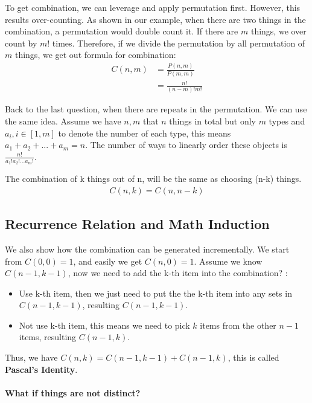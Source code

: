 \documentclass[../main.tex]{subfiles}
\begin{document}
To get combination, we can leverage and apply permutation first. However, this results over-counting. As shown in our example, when there are two things in the combination, a permutation would double count it. If there are $m$ things, we over count by $m!$ times. Therefore, if we  divide the permutation by all permutation of $m$ things, we get out formula for combination:
\begin{align}
    C(n,m)&=\frac{P(n,m)}{P(m,m)}\\
    &=\frac{n!}{(n-m)!m!}
\end{align}
\begin{bclogo}[couleur = blue!30, arrondi=0.1,logo=\bccrayon,ombre=true]{Back to the last question, when there are repeats in the permutation. We can use the same idea. Assume we have $n,m$ that $n$ things in total but only $m$ types and $a_i, i\in[1,m]$ to denote the number of each type, this means $a_1+ a_2+ ... + a_m= n$. The number of ways to linearly order these objects is $\frac{n!}{a_1!a_2!...a_m!}$. } 
\end{bclogo}


The combination of k things out of n, will be the same as choosing (n-k) things.
    \begin{align}
        C(n,k)=C(n, n-k)
    \end{align}

\subsection{Recurrence Relation and Math Induction} We also show how the combination can be generated incrementally. We start from $C(0,0)=1$, and easily we get $C(n, 0)=1$. Assume we know $C(n-1, k-1)$, now we need to add the k-th item into the combination? :
\begin{itemize}
    \item Use k-th item, then we just need to put the the k-th item into any sets in $C(n-1,k-1)$, resulting $C(n-1,k-1)$.
    \item Not use k-th item, this means we need to pick $k$ items from the other $n-1$ items, resulting $C(n-1,k)$. 
\end{itemize}
Thus, we have $C(n, k) = C(n-1, k-1) + C(n-1, k)$, this is called \textbf{Pascal's Identity}. 

\paragraph{What if things are not distinct?}
\end{document}
